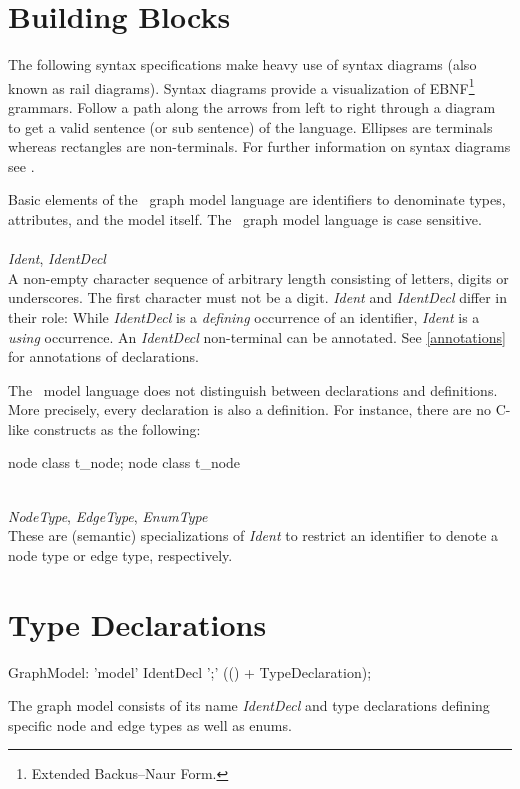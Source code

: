 \section{Building Blocks}
\label{modelbb}

\begin{note}
The following syntax specifications make heavy use of syntax diagrams (also known as rail diagrams). Syntax diagrams provide a visualization of EBNF\footnote{Extended Backus–Naur Form.} grammars. Follow a path along the arrows from left to right through a diagram to get a valid sentence (or sub sentence) of the language. Ellipses are terminals whereas rectangles are non-terminals. For further information on syntax diagrams see \cite{MMJW:91}.
\end{note}
Basic elements of the \GrG\ graph model language are identifiers to denominate types, attributes, and the model itself. The \GrG\ graph model language is case sensitive.\\
\\
\emph{Ident}, \emph{IdentDecl}\\ \nopagebreak
A non-empty character sequence of arbitrary length consisting of letters, digits or underscores. The first character must not be a digit. \emph{Ident} and \emph{IdentDecl} differ in their role: While \emph{IdentDecl} is a \emph{defining} occurrence of an identifier, \emph{Ident} is a \emph{using} occurrence. An \emph{IdentDecl} non-terminal can be annotated. See \ref{annotations} for annotations of declarations.
\begin{note}
  The \GrG\ model language does not distinguish between declarations and definitions. More precisely, every declaration is also a definition. For instance, there are no C-like constructs as the following:
\begin{grgen}
node class t_node;
node class t_node {
}
\end{grgen}
\end{note}
\mbox{ }\\
\emph{NodeType}, \emph{EdgeType}, \emph{EnumType}\\ \nopagebreak
These are (semantic) specializations of \emph{Ident} to restrict an identifier to denote a node type or edge type, respectively.

\section{Type Declarations}
\begin{rail}
  GraphModel: 'model' IdentDecl ';' (() + TypeDeclaration);
\end{rail}
The graph model consists of its name \emph{IdentDecl} and type declarations defining specific node and edge types as well as enums.

